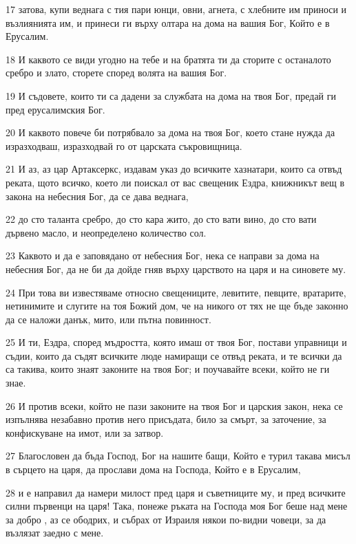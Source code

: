 \par 17 затова, купи веднага с тия пари юнци, овни, агнета, с хлебните им приноси и възлиянията им, и принеси ги върху олтара на дома на вашия Бог, Който е в Ерусалим.
\par 18 И каквото се види угодно на тебе и на братята ти да сторите с останалото сребро и злато, сторете според волята на вашия Бог.
\par 19 И съдовете, които ти са дадени за службата на дома на твоя Бог, предай ги пред ерусалимския Бог.
\par 20 И каквото повече би потрябвало за дома на твоя Бог, което стане нужда да изразходваш, изразходвай го от царската съкровищница.
\par 21 И аз, аз цар Артаксеркс, издавам указ до всичките хазнатари, които са отвъд реката, щото всичко, което ли поискал от вас свещеник Ездра, книжникът вещ в закона на небесния Бог, да се дава веднага,
\par 22 до сто таланта сребро, до сто кара жито, до сто вати вино, до сто вати дървено масло, и неопределено количество сол.
\par 23 Каквото и да е заповядано от небесния Бог, нека се направи за дома на небесния Бог, да не би да дойде гняв върху царството на царя и на синовете му.
\par 24 При това ви известяваме относно свещениците, левитите, певците, вратарите, нетинимите и слугите на тоя Божий дом, че на никого от тях не ще бъде законно да се наложи данък, мито, или пътна повинност.
\par 25 И ти, Ездра, според мъдростта, която имаш от твоя Бог, постави управници и съдии, които да съдят всичките люде намиращи се отвъд реката, и те всички да са такива, които знаят законите на твоя Бог; и поучавайте всеки, който не ги знае.
\par 26 И против всеки, който не пази законите на твоя Бог и царския закон, нека се изпълнява незабавно против него присъдата, било за смърт, за заточение, за конфискуване на имот, или за затвор.
\par 27 Благословен да бъда Господ, Бог на нашите бащи, Който е турил такава мисъл в сърцето на царя, да прослави дома на Господа, Който е в Ерусалим,
\par 28 и е направил да намери милост пред царя и съветниците му, и пред всичките силни първенци на царя! Така, понеже ръката на Господа моя Бог беше над мене за добро , аз се ободрих, и събрах от Израиля някои по-видни човеци, за да възлязат заедно с мене.

